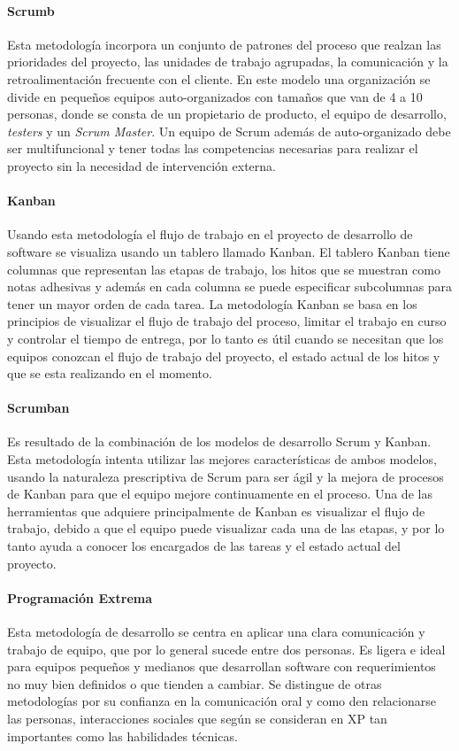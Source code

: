 \paragraph{Scrumb} Esta metodología incorpora un conjunto de patrones del proceso que realzan las prioridades del proyecto, las unidades de trabajo agrupadas, la comunicación y la retroalimentación frecuente con el cliente. En este modelo una organización se divide en pequeños equipos auto-organizados con tamaños que van de 4 a 10 personas, donde se consta de un propietario de producto, el equipo de desarrollo, \textit{testers} y un \textit{Scrum Master}. Un equipo de Scrum además de auto-organizado debe ser multifuncional y tener todas las competencias necesarias para realizar el proyecto sin la necesidad de intervención externa.

\paragraph{Kanban} Usando esta metodología el flujo de trabajo en el proyecto de desarrollo de software se visualiza usando un tablero llamado Kanban. El tablero Kanban tiene columnas que representan las etapas de trabajo, los hitos que se muestran como notas adhesivas y además en cada columna se puede especificar subcolumnas para tener un mayor orden de cada tarea. La metodología Kanban se basa en los principios de visualizar el flujo de trabajo del proceso, limitar el trabajo en curso y controlar el tiempo de entrega, por lo tanto es útil cuando se necesitan que los equipos conozcan el flujo de trabajo del proyecto, el estado actual de los hitos y que se esta realizando en el momento.

\paragraph{Scrumban} Es resultado de la combinación de los modelos de desarrollo Scrum y Kanban. Esta metodología intenta utilizar las mejores características de ambos modelos, usando la naturaleza prescriptiva de Scrum para ser ágil y la mejora de procesos de Kanban para que el equipo mejore continuamente en el proceso. Una de las herramientas que adquiere principalmente de Kanban es visualizar el flujo de trabajo, debido a que el equipo puede visualizar cada una de las etapas, y por lo tanto ayuda a conocer los encargados de las tareas y el estado actual del proyecto.

\paragraph{Programación Extrema} Esta metodología de desarrollo se centra en aplicar una clara comunicación y trabajo de equipo, que por lo general sucede entre dos personas. Es ligera e ideal para equipos pequeños y medianos que desarrollan software con requerimientos no muy bien definidos o que tienden a cambiar. Se distingue de otras metodologías por su confianza en la comunicación oral y como den relacionarse las personas, interacciones sociales que según \textcite{Beck2004} se consideran en XP tan importantes como las habilidades técnicas.

